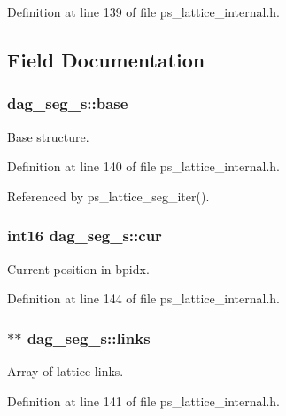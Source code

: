 Definition at line 139 of file ps\+\_\+lattice\+\_\+internal.\+h.



\subsection{Field Documentation}
\subsubsection[{base}]{ dag\+\_\+seg\+\_\+s\+::base}\label{structdag__seg__s_a72f90e137c1f83ab3df6ecd5e1b6dc71}


Base structure. 



Definition at line 140 of file ps\+\_\+lattice\+\_\+internal.\+h.



Referenced by ps\+\_\+lattice\+\_\+seg\+\_\+iter().

\subsubsection[{cur}]{\setlength{\rightskip}{0pt plus 5cm}int16 dag\+\_\+seg\+\_\+s\+::cur}\label{structdag__seg__s_a0fed697e06d12e5a0405fdcb0d97faf1}


Current position in bpidx. 



Definition at line 144 of file ps\+\_\+lattice\+\_\+internal.\+h.

\subsubsection[{links}]{$\ast$$\ast$ dag\+\_\+seg\+\_\+s\+::links}\label{structdag__seg__s_a5fcc22d787e4db1bdc728ff8faead738}


Array of lattice links. 



Definition at line 141 of file ps\+\_\+lattice\+\_\+internal.\+h.



